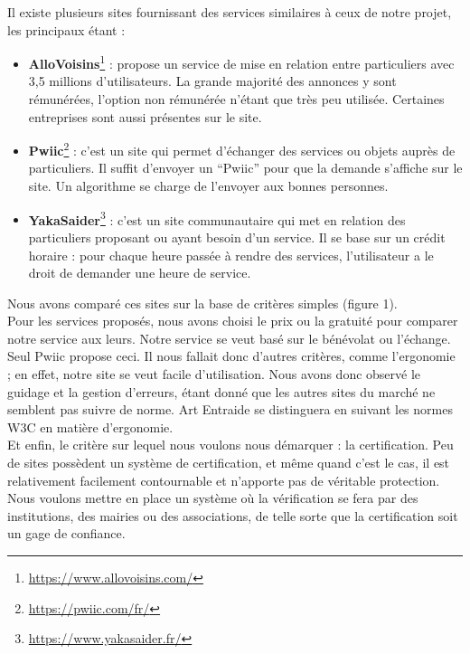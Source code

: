 \documentclass[a4paper,11pt]{article}
\begin{document}
Il existe plusieurs sites fournissant des services similaires à ceux de notre projet, les principaux étant :\\

\begin{itemize}
  \item \textbf{AlloVoisins}\footnote{\url{https://www.allovoisins.com/}} : propose un service de mise en relation entre particuliers avec 3,5 millions d'utilisateurs. La grande majorité des annonces y sont rémunérées, l’option non rémunérée
  n’étant que très peu utilisée. Certaines entreprises sont aussi présentes sur le site.

  \item \textbf{Pwiic}\footnote{\url{https://pwiic.com/fr/}} : c’est un site qui permet d’échanger des services ou objets auprès de particuliers. Il suffit d’envoyer un “Pwiic” pour que la demande s’affiche sur le site. Un algorithme se charge de
  l’envoyer aux bonnes personnes.

  \item \textbf{YakaSaider}\footnote{\url{https://www.yakasaider.fr/}} : c’est un site communautaire qui met en relation des particuliers proposant ou ayant besoin d'un service. Il se base sur un crédit horaire : pour chaque heure passée à rendre des services, l’utilisateur a le droit de demander une heure de service.
\end{itemize}

Nous avons comparé ces sites sur la base de critères simples (figure 1).\\
Pour les services proposés, nous avons choisi le prix ou la gratuité pour comparer notre service aux leurs.
Notre service se veut basé sur le bénévolat ou l'échange. Seul Pwiic propose ceci.
Il nous fallait donc d'autres critères, comme l'ergonomie ; en effet, notre site se veut facile d'utilisation.
Nous avons donc observé le guidage et la gestion d'erreurs, étant donné que les autres sites du marché ne semblent pas suivre de norme. Art Entraide se distinguera en suivant les normes W3C en matière d'ergonomie.\\
Et enfin, le critère sur lequel nous voulons nous démarquer : la certification.
Peu de sites possèdent un système de certification, et même quand c'est le cas, il est relativement facilement contournable et n'apporte pas de véritable protection.
Nous voulons mettre en place un système où la vérification se fera par des institutions, des mairies ou des associations, de telle sorte que la certification soit un gage de confiance.\\
\end{document}
